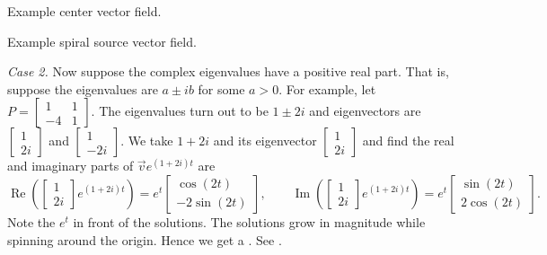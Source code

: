 \documentclass{ximera}
\begin{document}
\begin{myfig}
    \parbox[t]{3.0in}{
    \capstart
    \caption{Example center vector field.\label{pln:ellipsesfig}}}
    \quad \parbox[t]{3.0in}{
    \capstart
    \caption{Example spiral source vector field.\label{pln:spiral-sourcefig}}}
\end{myfig}

\emph{Case 2.} Now suppose the complex eigenvalues have a positive real part.  That is, suppose the eigenvalues are $a \pm ib$ for some $a > 0$. For example, let $P = \left[ \begin{smallmatrix} 1 & 1 \\ -4 & 1 \end{smallmatrix} \right]$. The eigenvalues turn out to be $1\pm 2i$ and eigenvectors are $\left[ \begin{smallmatrix} 1 \\ 2i \end{smallmatrix} \right]$ and $\left[ \begin{smallmatrix} 1 \\ -2i \end{smallmatrix} \right]$.  We take $1 + 2i$ and its eigenvector $\left[ \begin{smallmatrix} 1 \\ 2i \end{smallmatrix} \right]$ and find the real and imaginary parts of $\vec{v} e^{(1+2i)t}$ are
\begin{equation*}
    \operatorname{Re}\left(
    \begin{bmatrix} 
        1 \\ 
        2i 
    \end{bmatrix} 
    e^{(1+2i)t}\right) = e^t
    \begin{bmatrix} 
        \cos (2t) \\ 
        -2 \sin (2t)  
    \end{bmatrix} ,
    \qquad \operatorname{Im}\left(
    \begin{bmatrix} 
        1 \\ 
        2i 
    \end{bmatrix} 
    e^{(1+2i)t} \right)= e^t
    \begin{bmatrix} 
        \sin (2t) \\ 
        2 \cos (2t) 
    \end{bmatrix} .
\end{equation*}
Note the $e^t$ in front of the solutions.  The solutions grow in magnitude while spinning around the origin.  Hence we get a \emph{}. See .
\end{document}
